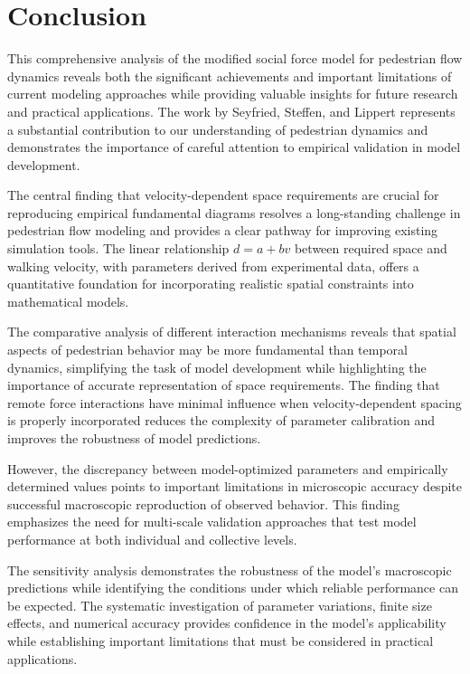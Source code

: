 \documentclass[12pt,a4paper]{article}
\begin{document}
\section{Conclusion}

This comprehensive analysis of the modified social force model for pedestrian flow dynamics reveals both the significant achievements and important limitations of current modeling approaches while providing valuable insights for future research and practical applications. The work by Seyfried, Steffen, and Lippert represents a substantial contribution to our understanding of pedestrian dynamics and demonstrates the importance of careful attention to empirical validation in model development.

The central finding that velocity-dependent space requirements are crucial for reproducing empirical fundamental diagrams resolves a long-standing challenge in pedestrian flow modeling and provides a clear pathway for improving existing simulation tools. The linear relationship $d = a + bv$ between required space and walking velocity, with parameters derived from experimental data, offers a quantitative foundation for incorporating realistic spatial constraints into mathematical models.

The comparative analysis of different interaction mechanisms reveals that spatial aspects of pedestrian behavior may be more fundamental than temporal dynamics, simplifying the task of model development while highlighting the importance of accurate representation of space requirements. The finding that remote force interactions have minimal influence when velocity-dependent spacing is properly incorporated reduces the complexity of parameter calibration and improves the robustness of model predictions.

However, the discrepancy between model-optimized parameters and empirically determined values points to important limitations in microscopic accuracy despite successful macroscopic reproduction of observed behavior. This finding emphasizes the need for multi-scale validation approaches that test model performance at both individual and collective levels.

The sensitivity analysis demonstrates the robustness of the model's macroscopic predictions while identifying the conditions under which reliable performance can be expected. The systematic investigation of parameter variations, finite size effects, and numerical accuracy provides confidence in the model's applicability while establishing important limitations that must be considered in practical applications.
\end{document}

